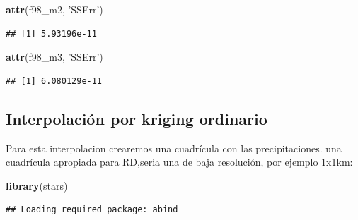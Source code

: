 \documentclass[11pt,]{article}
\newenvironment{Shaded}{\begin{snugshade}}{\end{snugshade}}
\newcommand{\KeywordTok}[1]{\textcolor[rgb]{0.13,0.29,0.53}{\textbf{#1}}}
\newcommand{\DataTypeTok}[1]{\textcolor[rgb]{0.13,0.29,0.53}{#1}}
\newcommand{\DecValTok}[1]{\textcolor[rgb]{0.00,0.00,0.81}{#1}}
\newcommand{\StringTok}[1]{\textcolor[rgb]{0.31,0.60,0.02}{#1}}
\newcommand{\OperatorTok}[1]{\textcolor[rgb]{0.81,0.36,0.00}{\textbf{#1}}}
\newcommand{\NormalTok}[1]{#1}
\begin{document}
\begin{Shaded}
\begin{Highlighting}[]
\KeywordTok{attr}\NormalTok{(f98_m2, }\StringTok{'SSErr'}\NormalTok{) }
\end{Highlighting}
\end{Shaded}

\begin{verbatim}
## [1] 5.93196e-11
\end{verbatim}

\begin{Shaded}
\begin{Highlighting}[]
\KeywordTok{attr}\NormalTok{(f98_m3, }\StringTok{'SSErr'}\NormalTok{)}
\end{Highlighting}
\end{Shaded}

\begin{verbatim}
## [1] 6.080129e-11
\end{verbatim}

\subsection{Interpolación por kriging
ordinario}\label{interpolaciuxf3n-por-kriging-ordinario}

Para esta interpolacion crearemos una cuadrícula con las
precipitaciones. una cuadrícula apropiada para RD,seria una de baja
resolución, por ejemplo 1x1km:

\begin{Shaded}
\begin{Highlighting}[]
\KeywordTok{library}\NormalTok{(stars)}
\end{Highlighting}
\end{Shaded}

\begin{verbatim}
## Loading required package: abind
\end{verbatim}

\begin{Shaded}
\end{Shaded}
\end{document}
